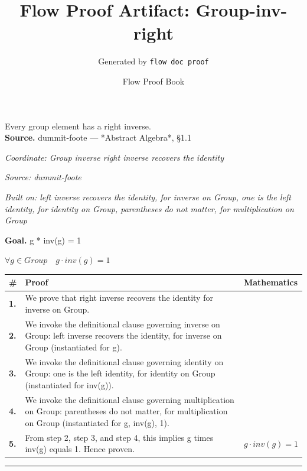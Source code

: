 \documentclass[11pt]{article}
\title{Flow Proof Artifact: Group-inv-right}
\author{Generated by \texttt{flow doc proof}}
\date{Flow Proof Book}
\theoremstyle{definition}
\begin{document}
\maketitle
Every group element has a right inverse.\\[0.5em]
\textbf{Source.} dummit-foote — *Abstract Algebra*, §1.1\\[0.5em]
\bigskip
{}\par
\smallskip\noindent\textit{Coordinate: Group \cdot inverse \cdot right inverse recovers the identity}\par
\smallskip\noindent\textit{Source: dummit-foote}\par
\smallskip\noindent\textit{Built on: left inverse recovers the identity, for inverse on Group, one is the left identity, for identity on Group, parentheses do not matter, for multiplication on Group}\par
\medskip
\noindent\textbf{Goal.} g * inv(g) = 1\par
\noindent$\displaystyle \forall g \in Group\quad g \cdot inv(g) = 1$\par
\medskip
\noindent
\begin{tabular}{@{} >{\raggedright\arraybackslash}p{} >{\raggedright\arraybackslash}p{} >{\raggedleft\arraybackslash}p{} @{}}
\textbf{\#} & \textbf{Proof} & \textbf{Mathematics} \\
\midrule
\textbf{1.} & We prove that right inverse recovers the identity for inverse on Group. & \\[0.45em]
\textbf{2.} & We invoke the definitional clause governing inverse on Group: left inverse recovers the identity, for inverse on Group (instantiated for g). & \\[0.45em]
\textbf{3.} & We invoke the definitional clause governing identity on Group: one is the left identity, for identity on Group (instantiated for inv(g)). & \\[0.45em]
\textbf{4.} & We invoke the definitional clause governing multiplication on Group: parentheses do not matter, for multiplication on Group (instantiated for g, inv(g), 1). & \\[0.45em]
\textbf{5.} & From step 2, step 3, and step 4, this implies g times inv(g) equals 1. Hence proven. & $\displaystyle g \cdot inv(g) = 1$ \\[0.45em]
\bottomrule
\end{tabular}
\label{thm:Group-inverse-right_inverse_recovers_the_identity}
\par\medskip\hrule
\end{document}
